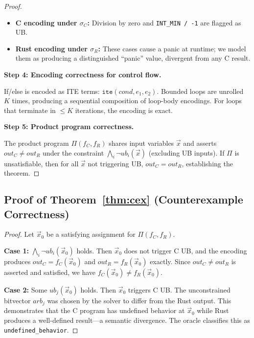 \documentclass[11pt]{article}
\begin{document}
\begin{proof}
\begin{itemize}[nosep]
\item \textbf{C encoding under $\sigma_C$:}
  Division by zero and \texttt{INT\_MIN / -1} are flagged as UB.

\item \textbf{Rust encoding under $\sigma_R$:}
  These cases cause a panic at runtime; we model them as producing a
  distinguished ``panic'' value, divergent from any C result.
\end{itemize}

\medskip\noindent\textbf{Step 4: Encoding correctness for control flow.}

If/else is encoded as ITE terms: $\texttt{ite}(\mathit{cond}, e_1, e_2)$.
Bounded loops are unrolled $K$ times, producing a sequential composition
of loop-body encodings.  For loops that terminate in $\leq K$ iterations,
the encoding is exact.

\medskip\noindent\textbf{Step 5: Product program correctness.}

The product program $\Pi(f_C, f_R)$ shares input variables $\vec{x}$ and
asserts $\mathit{out}_C \neq \mathit{out}_R$ under the constraint
$\bigwedge_i \neg\mathit{ub}_i(\vec{x})$ (excluding UB inputs).
If $\Pi$ is unsatisfiable, then for all $\vec{x}$ not triggering UB,
$\mathit{out}_C = \mathit{out}_R$, establishing the theorem.
\end{proof}

\subsection{Proof of Theorem~\ref{thm:cex} (Counterexample Correctness)}

\begin{proof}
Let $\vec{x}_0$ be a satisfying assignment for $\Pi(f_C, f_R)$.

\textbf{Case 1:} $\bigwedge_i \neg\mathit{ub}_i(\vec{x}_0)$ holds.
Then $\vec{x}_0$ does not trigger C UB, and the encoding produces
$\mathit{out}_C = f_C(\vec{x}_0)$ and $\mathit{out}_R = f_R(\vec{x}_0)$
exactly.  Since $\mathit{out}_C \neq \mathit{out}_R$ is asserted and
satisfied, we have $f_C(\vec{x}_0) \neq f_R(\vec{x}_0)$.

\textbf{Case 2:} Some $\mathit{ub}_j(\vec{x}_0)$ holds.
Then $\vec{x}_0$ triggers C UB.  The unconstrained bitvector
$\mathit{arb}_j$ was chosen by the solver to differ from the Rust output.
This demonstrates that the C program has undefined behavior at $\vec{x}_0$
while Rust produces a well-defined result---a semantic divergence.  The
oracle classifies this as \texttt{undefined\_behavior}.
\end{proof}
\end{document}
